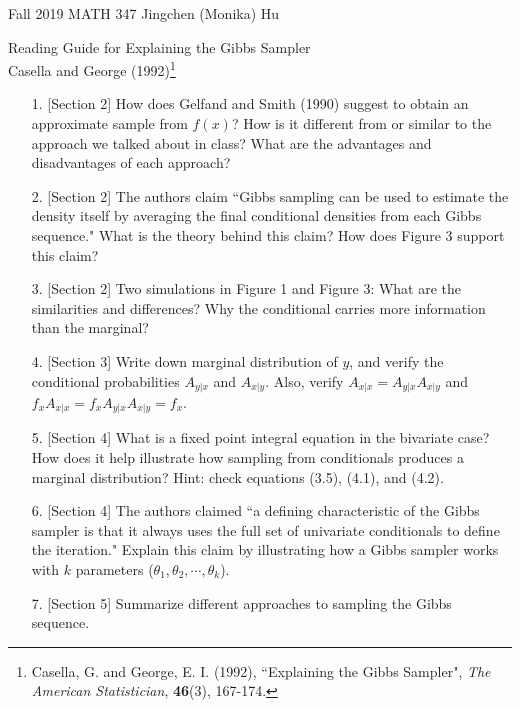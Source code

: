 \documentclass[11pt]{article}
\begin{document}
\enlargethispage{\baselineskip}

Fall 2019 MATH 347 \hfill Jingchen (Monika) Hu\\

\begin{center}
{\huge Reading Guide for Explaining the Gibbs Sampler}	\\
Casella and George (1992)\footnote{Casella, G. and George, E. I. (1992), ``Explaining the Gibbs Sampler", {\it{The American Statistician}}, {\bf{46}}(3), 167-174.}
\end{center}
\vspace{0.5cm}


\begin{enumerate}

\item[1.] [Section 2] How does Gelfand and Smith (1990) suggest to obtain an approximate sample from $f(x)$? How is it different from or similar to the approach we talked about in class? What are the advantages and disadvantages of each approach?
\vspace{5mm}

\item[2.] [Section 2] The authors claim ``Gibbs sampling can be used to estimate the density itself by averaging the final conditional densities from each Gibbs sequence." What is the theory behind this claim? How does Figure 3 support this claim?
\vspace{5mm}

\item[3.] [Section 2] Two simulations in Figure 1 and Figure 3: What are the similarities and differences? Why the conditional carries more information than the marginal?
\vspace{5mm}

\item[4.] [Section 3] Write down marginal distribution of $y$, and verify the conditional probabilities $A_{y|x}$ and $A_{x|y}$. Also, verify $A_{x|x} = A_{y|x}A_{x|y}$ and $f_xA_{x|x} = f_xA_{y|x}A_{x|y} = f_x$.
\vspace{5mm}

\item[5.] [Section 4] What is a fixed point integral equation in the bivariate case? How does it help illustrate how sampling from conditionals produces a marginal distribution? Hint: check equations (3.5), (4.1), and (4.2).
\vspace{5mm}

\item[6.] [Section 4] The authors claimed ``a defining characteristic of the Gibbs sampler is that it always uses the full set of univariate conditionals to define the iteration." Explain this claim by illustrating how a Gibbs sampler works with $k$ parameters ($\theta_1, \theta_2, \cdots, \theta_k$).
\vspace{5mm}

\item[7.] [Section 5] Summarize different approaches to sampling the Gibbs sequence.
\vspace{5mm}



\end{enumerate}
\end{document}
